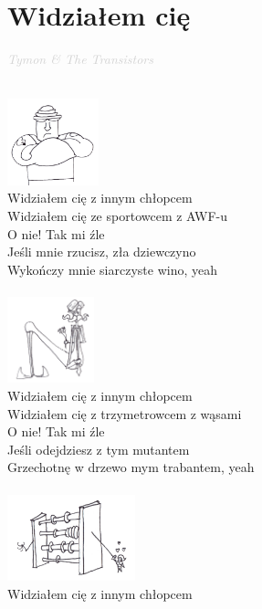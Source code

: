 \documentclass[a5paper, 10pt]{book}
\begin{document}
\section{Widziałem cię}\textcolor{lightgray}{\textit{Tymon \& The Transistors
}}\\
\begin{minipage}[t]{0.85\textwidth}
~\\
\includegraphics[height=2.5cm, right]{widzialem_cie_1.png}\vspace*{-2.6cm}\\
Widziałem cię z innym chłopcem\\
Widziałem cię ze sportowcem z AWF-u\\
O nie! Tak mi źle\\
Jeśli mnie rzucisz, zła dziewczyno\\
Wykończy mnie siarczyste wino, yeah\\
\\
\includegraphics[height=2.5cm, right]{widzialem_cie_2.png}\vspace*{-2.6cm}\\
Widziałem cię z innym chłopcem\\
Widziałem cię z trzymetrowcem z wąsami\\
O nie! Tak mi źle\\
Jeśli odejdziesz z tym mutantem\\
Grzechotnę w drzewo mym trabantem, yeah\\
\\
\includegraphics[height=2.5cm, right]{widzialem_cie_3.png}\vspace*{-2.6cm}\\
Widziałem cię z innym chłopcem\\

\end{minipage}
\end{document}
